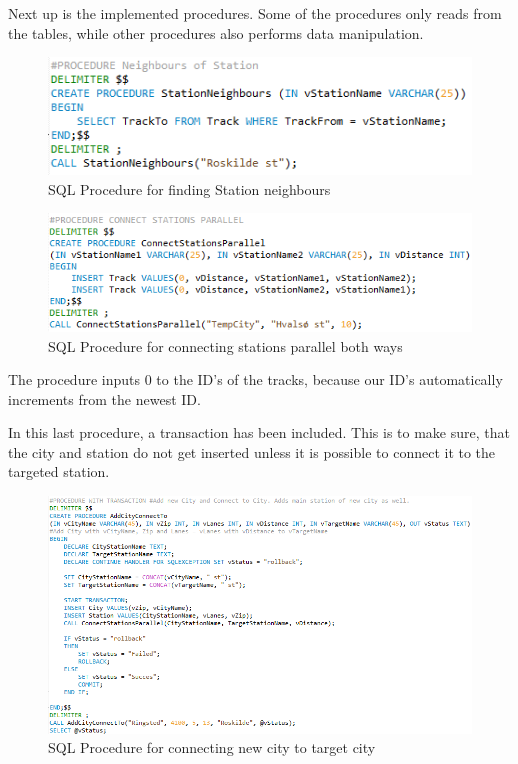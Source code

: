 Next up is the implemented procedures. Some of the procedures only reads from 
the tables, while other procedures also performs data manipulation.

\begin{figure}[ht!]
    \centering
    \includegraphics[width=.7\textwidth]{img/SQL_PROCEDURE_Neighbours}
    \caption{SQL Procedure for finding Station neighbours}
\end{figure}

\begin{figure}[ht!]
    \centering
    \includegraphics[width=1\textwidth]{img/SQL_PROCEDURE_ConnectParallel}
    \caption{SQL Procedure for connecting stations parallel both ways}
\end{figure}

The procedure inputs 0 to the ID's of the tracks, because our ID's 
automatically increments from the newest ID.

\newpage
In this last procedure, a transaction has been included. This is to make sure, 
that the city and station do not get inserted unless it is possible to connect 
it to the targeted station.

\begin{figure}[ht!]
    \centering
    \includegraphics[width=1\textwidth]{img/SQL_PROCEDURE_AddCityConnect}
    \caption{SQL Procedure for connecting new city to target city}
\end{figure}

